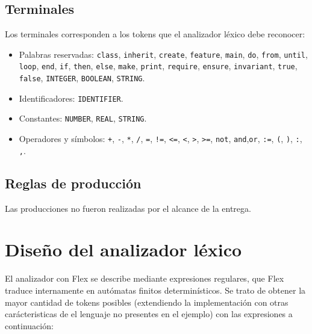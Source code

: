 \documentclass[a4paper,12pt]{article}
\begin{document}
\subsection{Terminales}
Los terminales corresponden a los tokens que el analizador léxico debe
reconocer:
\begin{itemize}
    \item Palabras reservadas: \texttt{class}, \texttt{inherit},
          \texttt{create},
          \texttt{feature}, \texttt{main}, \texttt{do},
          \texttt{from}, \texttt{until},
          \texttt{loop},
          \texttt{end}, \texttt{if},
          \texttt{then}, \texttt{else}, \texttt{make}, \texttt{print},
          \texttt{require}, \texttt{ensure}, \texttt{invariant},
          \texttt{true}, \texttt{false},
          \texttt{INTEGER}, \texttt{BOOLEAN}, \texttt{STRING}.
    \item Identificadores: \texttt{IDENTIFIER}.
    \item Constantes: \texttt{NUMBER}, \texttt{REAL}, \texttt{STRING}.
    \item Operadores y símbolos:  \texttt{+}, \texttt{-},
          \texttt{*}, \texttt{/},
          \texttt{=}, \texttt{!=},
          \texttt{<=}, \texttt{<},
          \texttt{>}, \texttt{>=},
          \texttt{not}, \texttt{and},\texttt{or},
          \texttt{:=}, \texttt{(}, \texttt{)}, 
          \texttt{:}, \texttt{,}.
\end{itemize}

\subsection{Reglas de producción}
Las producciones no fueron realizadas por el alcance de la entrega.


\section{Diseño del analizador léxico}
\vspace{4mm}
El analizador con Flex se describe mediante expresiones regulares, que Flex
traduce internamente en autómatas finitos determinísticos.
Se trato de obtener la mayor cantidad de tokens posibles (extendiendo la
implementación con otras carácteristicas de el lenguaje no presentes en el
ejemplo) con las expresiones a
continuación:
\end{document}
